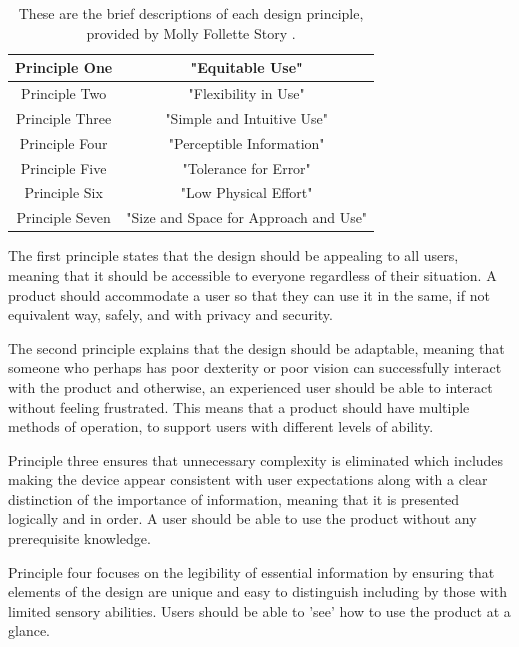 \begin{table} [h]
    \begin{center}
        \vspace{5mm}
        \caption{These are the brief descriptions of each design principle, provided by Molly Follette Story \cite{sevenprinciples}.}
        \label{tab:DesignPrinciples}
        \begin{tabular}{ |c|c| }
        \hline
        Principle One & "Equitable Use" \\
        \hline
        Principle Two & "Flexibility in Use" \\ 
        \hline
        Principle Three & "Simple and Intuitive Use" \\ 
        \hline
        Principle Four & "Perceptible Information" \\
        \hline 
        Principle Five & "Tolerance for Error" \\ 
        \hline
        Principle Six & "Low Physical Effort" \\ 
        \hline
        Principle Seven & "Size and Space for Approach and Use" \\
        \hline
        \end{tabular}
    \end{center}
\end{table}

The first principle states that the design should be appealing to all users, meaning that it should be accessible to everyone regardless of their situation.
A product should accommodate a user so that they can use it in the same, if not equivalent way, safely, and with privacy and security.

The second principle explains that the design should be adaptable, meaning that someone who perhaps has poor dexterity or poor vision can successfully interact with the product and otherwise, an experienced user should be able to interact without feeling frustrated. %
This means that a product should have multiple methods of operation, to support users with different levels of ability.

Principle three ensures that unnecessary complexity is eliminated which includes making the device appear consistent with user expectations along with a clear distinction of the importance of information, meaning that it is presented logically and in order.
A user should be able to use the product without any prerequisite knowledge.

Principle four focuses on the legibility of essential information by ensuring that elements of the design are unique and easy to distinguish including by those with limited sensory abilities.
Users should be able to 'see' how to use the product at a glance.

